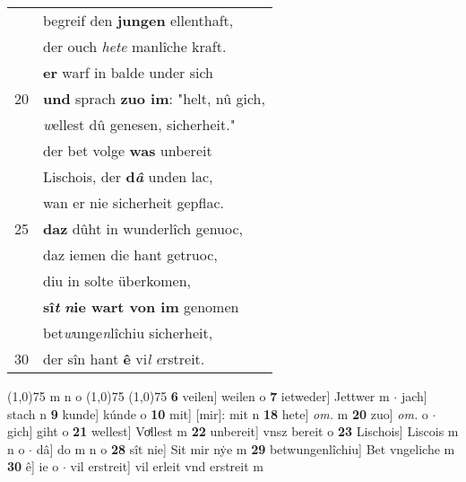 \documentclass[8pt,a4paper,notitlepage]{article}
\begin{document}
\begin{table}[ht]
\begin{minipage}[t]{0.5\linewidth}
\begin{tabular}{rl}
 & begreif den \textbf{jungen} ellenthaft,\\ 
 & der ouch \textit{hete} manlîche kraft.\\ 
 & \textbf{er} warf in balde under sich\\ 
20 & \textbf{und} sprach \textbf{zuo im}: "helt, nû gich,\\ 
 & \textit{w}ellest dû genesen, sicherheit."\\ 
 & der bet volge \textbf{was} unbereit\\ 
 & Lischois, der \textbf{d\textit{â}} unden lac,\\ 
 & wan er nie sicherheit gepflac.\\ 
25 & \textbf{daz} dûht in wunderlîch genuoc,\\ 
 & daz iemen die hant getruoc,\\ 
 & diu in solte überkomen,\\ 
 & \textbf{sî\textit{t}} \textbf{\textit{n}ie wart von im} genomen\\ 
 & bet\textit{w}unge\textit{n}lîchiu sicherheit,\\ 
30 & der sîn hant \textbf{ê} vi\textit{l} \textit{e}rstreit.\\ 
\end{tabular}
\scriptsize
\line(1,0){75} \newline
m n o \newline
\line(1,0){75} \newline
\newline
\line(1,0){75} \newline
\textbf{6} veilen] weilen o \textbf{7} ietweder] Jettwer m  $\cdot$ jach] stach n \textbf{9} kunde] kúnde o \textbf{10} mit] [mir]: mit n \textbf{18} hete] \textit{om.} m \textbf{20} zuo] \textit{om.} o  $\cdot$ gich] giht o \textbf{21} wellest] Voͯllest m \textbf{22} unbereit] vnsz bereit o \textbf{23} Lischois] Liscois m n o  $\cdot$ dâ] do m n o \textbf{28} sît nie] Sit mir nẏe m \textbf{29} betwungenlîchiu] Bet vngeliche m \textbf{30} ê] ie o  $\cdot$ vil erstreit] vil erleit vnd erstreit m \newline
\end{minipage}
\end{table}
\newpage
\end{document}
